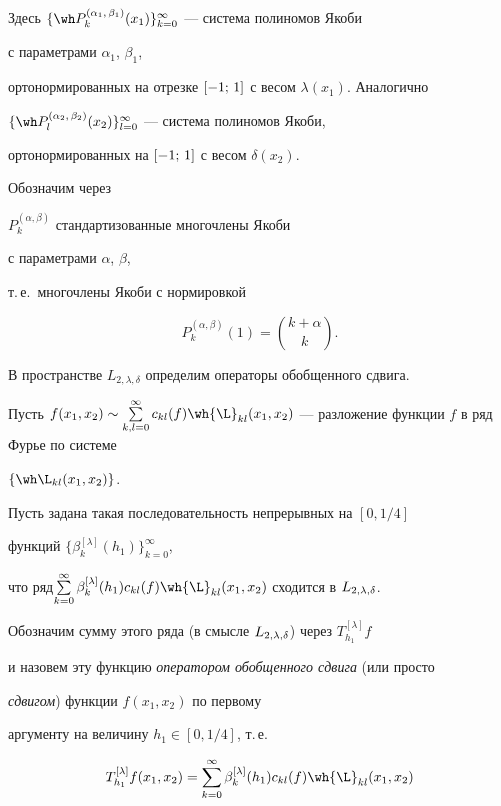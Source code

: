 Здесь $\{\PP(x_1)\}_{k=0}^\infty$ --- система полиномов Якоби


с параметрами $\alpha_1$, $\beta_1$,


ортонормированных на отрезке $[-1;\,1]$ с весом $\lambda(x_1)$. Аналогично


$\{{\PQ}(x_2)\}_{l=0}^\infty$ --- система полиномов Якоби,


ортонормированных на $[-1;\,1]$ с весом $\delta(x_2)$.


Обозначим через


$P_k^{(\alpha,\beta)}$ стандартизованные многочлены Якоби


с параметрами $\alpha$, $\beta$,


т.\,е.~многочлены Якоби с нормировкой


$$


P_k^{(\alpha,\beta)}(1)=\binom{k+\alpha}{k}.


$$





В пространстве $L_{2,\lambda,\delta}$ определим операторы обобщенного сдвига.


Пусть $f(x_1,x_2)\sim\linebreak \sum\limits_{k,l=0}^\infty c_{kl}(f)


\wh{\L}_{kl}(x_1,x_2)$ --- разложение функции $f$ в ряд Фурье по системе


$\{\Lkl\}$.


Пусть задана такая последовательность непрерывных на $[0,1/4]$


функций $\{\beta_k^{[\lambda]}(h_1)\}_{k=0}^\infty$,


что ряд\linebreak $\sum\limits_{k=0}^\infty \beta_k^{[\lambda]}(h_1)c_{kl}(f)


\wh{\L}_{kl}(x_1,x_2)$ сходится в $\LL$.


Обозначим сумму этого ряда (в смысле $L_{2,\lambda,\delta}$) через $T_{h_1}^{[\lambda]}f$


и назовем эту функцию {\it оператором обобщенного сдвига} (или просто


{\it сдвигом}) функции $f(x_1,x_2)$ по первому


аргументу на величину $h_1\in[0,1/4]$, т.\,е.


\begin{equation}


\label{oc}


T_{h_1}^{[\lambda]}f(x_1,x_2)=


\sum_{k=0}^\infty \beta_k^{[\lambda]}(h_1)c_{kl}(f)


\wh{\L}_{kl}(x_1,x_2)


\end{equation}


